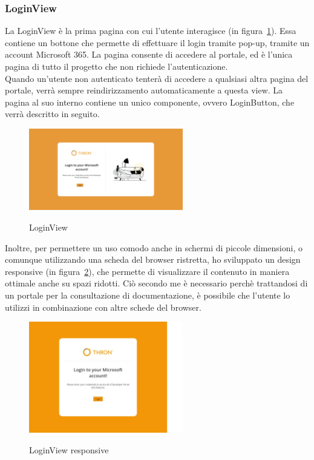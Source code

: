 \subsubsection{LoginView}\label{subsubsec:login-view}
La LoginView è la prima pagina con cui l'utente interagisce (in figura~\ref{fig:login-view}). Essa contiene un bottone che permette di effettuare il login tramite pop-up, tramite un account Microsoft 365.
La pagina consente di accedere al portale, ed è l'unica pagina di tutto il progetto che non richiede l'autenticazione.\\
Quando un'utente non autenticato tenterà di accedere a qualsiasi altra pagina del portale, verrà sempre reindirizzamento
automaticamente a questa view. La pagina al suo interno contiene un unico componente, ovvero LoginButton, che verrà descritto in seguito.
\begin{figure}[ht]
  \centering
  \includegraphics[width=0.6\textwidth, alt={Pagina di login dell'applicazione}]{images/frontend/LoginView.jpg}
  \caption{LoginView}\label{fig:login-view}
\end{figure}

Inoltre, per permettere un uso comodo anche in schermi di piccole dimensioni, o comunque utilizzando una scheda del browser ristretta, ho sviluppato
un design responsive (in figura~\ref{fig:login-view-responsive}), che permette di visualizzare il contenuto in maniera ottimale anche su spazi ridotti.
Ciò secondo me è necessario perchè trattandosi di un portale per la consultazione di documentazione, è possibile che l'utente 
lo utilizzi in combinazione con altre schede del browser.

\begin{figure}[ht]
  \centering
  \includegraphics[width=0.6\textwidth, alt={Pagina di login responsive dell'applicazione}]{images/frontend/LoginViewRes.jpg}
  \caption{LoginView responsive}\label{fig:login-view-responsive}
\end{figure}


